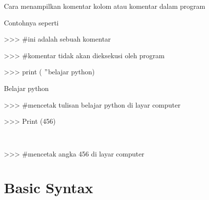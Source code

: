 \vspace{14pt}
\noindent 
{\fontsize{14pt}{14pt}\selectfont Cara menampilkan komentar kolom atau komentar dalam program \\} \par
\vspace{14pt}
\noindent 
{\fontsize{14pt}{14pt}\selectfont Contohnya seperti  \\} \par
\vspace{14pt}
\noindent 
{\fontsize{14pt}{14pt}\selectfont >>>  $  \#  $ini adalah sebuah komentar \\} \par
\vspace{14pt}
\noindent 
{\fontsize{14pt}{14pt}\selectfont >>> $  \#  $komentar tidak akan dieksekusi oleh program \\} \par
\vspace{14pt}
\noindent 
{\fontsize{14pt}{14pt}\selectfont >>> print ( $ " $belajar python) \\} \par
\vspace{14pt}
\noindent 
{\fontsize{14pt}{14pt}\selectfont Belajar python \\} \par
\vspace{14pt}
\noindent 
{\fontsize{14pt}{14pt}\selectfont >>> $  \#  $mencetak tulisan belajar python di layar computer \\} \par
\noindent 
{\fontsize{14pt}{14pt}\selectfont >>> Print (456) \\} \par
\noindent 
{\fontsize{14pt}{14pt} \\} \par
\noindent 
{\fontsize{14pt}{14pt}\selectfont >>> $  \#  $mencetak angka 456 di layar computer \\} \par
\vspace{14pt}
\vspace{14pt}
\vspace{14pt}
\noindent 
\section{Basic Syntax}
